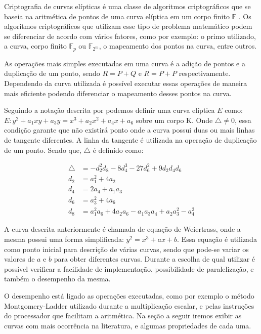 Criptografia de curvas elípticas é uma classe de algoritmos criptográficos que se baseia na aritmética de pontos de uma curva elíptica em um corpo finito $\mathbb{F}$ \cite{Hankerson:2003:GEC:940321}. Os algoritmos criptográficos que utilizam esse tipo de problema matemático podem se diferenciar de acordo com vários fatores, como por exemplo: o primo utilizado, a curva, corpo finito $\mathbb{F}_p$ ou $\mathbb{F}_{2^m}$, o mapeamento dos pontos na curva, entre outros. 

As operações mais simples executadas em uma curva é a adição de pontos e a duplicação de um ponto, sendo $R = P + Q$ e $R = P + P$ respectivamente. Dependendo da curva utilizada é possível executar essas operações de maneira mais eficiente podendo diferenciar o mapeamento desses pontos na curva.

Seguindo a notação descrita por \cite{Hankerson:2003:GEC:940321} podemos definir uma curva elíptica $E$ como: $E: y^2 + a_1xy + a_3y = x^3 + a_2x^2 + a_4x + a_6$ sobre um corpo K. Onde $\bigtriangleup \neq 0$, essa condição garante que não existirá ponto onde a curva possui duas ou mais linhas de tangente diferentes. A linha da tangente é utilizada na operação de duplicação de um ponto. Sendo que, $\bigtriangleup$ é definido como:

\begin{align*}
\bigtriangleup &= -d_2^2d_8 - 8d_4^3 - 27d_6^2 + 9d_2d_4d_6 \\
d_2 &= a_1^2 + 4a_2 \\
d_4 &= 2a_4 + a_1a_3 \\ 
d_6 &= a_3^2 + 4a_6 \\
d_8 &= a_1^2a_6 + 4a_2a_6 - a_1a_3a_4 + a_2a_3^2 - a_4^2
\end{align*}

A curva descrita anteriormente é chamada de equação de Weiertrass, onde a mesma possui uma forma simplificada: $y^2 = x^3 + ax + b$. Essa equação é utilizada como ponto inicial para descrição de várias curvas, sendo que pode-se variar os valores de $a$ e $b$ para obter diferentes curvas. Durante a escolha de qual utilizar é possível verificar a facilidade de implementação, possibilidade de paralelização, e também o desempenho da mesma. 

O desempenho está ligado as operações executadas, como por exemplo o método Montgomery-Ladder utilizado durante a multiplicação escalar, e pelas instruções do processador que facilitam a aritmética. Na seção a seguir iremos exibir as curvas com mais ocorrência na literatura, e algumas propriedades de cada uma.

